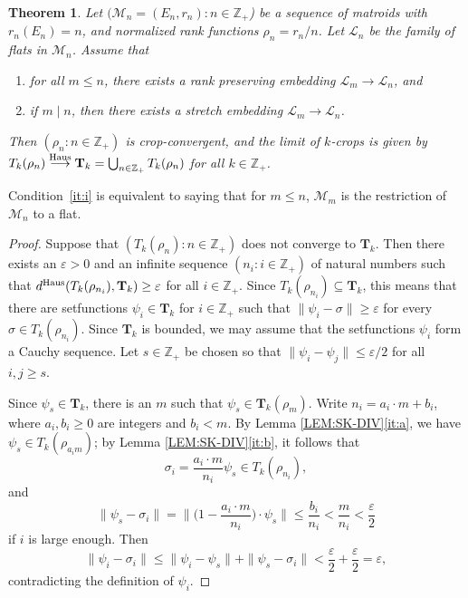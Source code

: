\documentclass[10pt]{article}
\theoremstyle{plain}
\newtheorem{thm}{Theorem}[section]
\theoremstyle{definition}
\newcommand{\bT}{\mathbf{T}}
\newcommand{\bbZ}{\mathbb{Z}}
\newcommand{\LL}{\mathcal{L}}
\newcommand{\MM}{\mathcal{M}}
\newcommand{\eps}{\varepsilon}
\newcommand{\Haus}{{\text{\rm Haus}}}
\newcommand{\hto}{\stackrel{\Haus}{\longrightarrow}}
\begin{document}
\begin{thm}\label{THM:MAT-CONV}
Let $(\MM_n=(E_n,r_n)\colon n\in\bbZ_+$) be a sequence of matroids with $r_n(E_n)=n$, and
normalized rank functions $\rho_n=r_n/n$. Let $\LL_n$ be the family of flats in
$\MM_n$. Assume that
\begin{enumerate}[label=(\roman*)]\itemsep0em
    \item for all $m\le n$, there exists a rank preserving embedding $\LL_m\to\LL_n$, and \label{it:i}
    \item if $m\mid n$, then there exists a stretch embedding $\LL_m\to\LL_n$. \label{it:ii}
\end{enumerate}
Then $(\rho_n\colon n\in\bbZ_+)$ is crop-convergent, and  the limit of
$k$-crops is given by $T_k(\rho_n)\hto \bT_k=\bigcup_{n\in\bbZ_+} T_k(\rho_n)$ for all $k\in\bbZ_+$.
\end{thm}
Condition~\ref{it:i} is equivalent to saying that for $m\leq n$, $\MM_m$ is the restriction of $\MM_n$ to a flat.
\begin{proof}
Suppose that $(T_k(\rho_n)\colon n\in\bbZ_+)$ does not converge to $\bT_k$. Then there exists an
$\eps>0$ and an infinite sequence $(n_i\colon i\in\bbZ_+)$ of natural numbers such that
$d^\Haus(T_k(\rho_{n_i}), \bT_k)\ge\eps$ for all $i\in\bbZ_+$. Since $T_k(\rho_{n_i})\subseteq \bT_k$,
this means that there are setfunctions $\psi_i\in \bT_k$ for $i\in\bbZ_+$ such that
$\|\psi_i-\sigma\|\ge\eps$ for every $\sigma\in T_k(\rho_{n_i})$. Since $ \bT_k$
is bounded, we may assume that the setfunctions $\psi_i$ form a Cauchy
sequence. Let $s\in\bbZ_+$ be chosen so that $\|\psi_i-\psi_j\|\le\eps/2$ for
all $i,j\ge s$.

Since $\psi_s\in \bT_k$, there is an $m$ such that $\psi_s\in \bT_k(\rho_m)$.
Write $n_i=a_i\cdot m+b_i$, where $a_i,b_i\ge 0$ are integers and $b_i<m$. By Lemma
\ref{LEM:SK-DIV}\ref{it:a}, we have $\psi_s\in T_k(\rho_{a_im})$; by Lemma
\ref{LEM:SK-DIV}\ref{it:b}, it follows that
\[
\sigma_i=\frac{a_i\cdot m}{n_i} \psi_s\in T_k(\rho_{n_i}),
\]
and
\[
\|\psi_s-\sigma_i\| = \Big\|\Big(1-\frac{a_i\cdot m}{n_i}\Big)\cdot\psi_s\Big\| \le \frac{b_i}{n_i}< \frac{m}{n_i}<\frac{\eps}{2}
\]
if $i$ is large enough. Then
\[
\|\psi_i-\sigma_i\|\le \|\psi_i-\psi_s\| + \|\psi_s-\sigma_i\| <\frac{\eps}{2}+\frac{\eps}{2} =\eps,
\]
contradicting the definition of $\psi_i$.
\end{proof}
\end{document}
